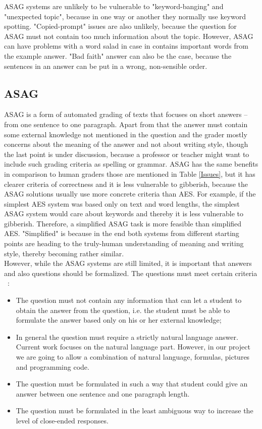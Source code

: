 ASAG systems are unlikely to be vulnerable to "keyword-banging" and "unexpected topic", because in one way or another they normally use keyword spotting. "Copied-prompt" issues are also unlikely, because the question for ASAG must not contain too much information about the topic. However, ASAG can have problems with a word salad in case in contains important words from the example answer. "Bad faith" answer can also be the case, because the sentences in an answer can be put in a wrong, non-sensible order.


\subsection{ASAG}

ASAG is a form of automated grading of texts that focuses on short answers -- from one sentence to one paragraph. Apart from that the answer must contain some external knowledge not mentioned in the question and the grader mostly concerns about the meaning of the answer and not about writing style, though the last point is under discussion, because a professor or teacher might want to include such grading criteria as spelling or grammar. ASAG has the same benefits in comparison to human graders those are mentioned in Table \ref{Issues}, but it has clearer criteria of correctness and it is less vulnerable to gibberish, because the ASAG solutions usually use more concrete criteria than AES. For example, if the simplest AES system was based only on text and word lengths, the simplest ASAG system would care about keywords and thereby it is less vulnerable to gibberish. Therefore, a simplified ASAG task is more feasible than simplified AES. "Simplified" is because in the end both systems from different starting points are heading  to the truly-human understanding of meaning and writing style, thereby becoming rather similar.\\

However, while the ASAG systems are still limited, it is important that answers and also questions should be formalized. The questions must meet certain criteria ~\cite{Hasanah}:
\begin{itemize}
\item The question must not contain any information that can let a student to obtain the answer from the question, i.e. the student must be able to formulate the answer based only on his or her external knowledge;
\item In general the question must require a strictly natural language answer. Current work focuses on the natural language part. However, in our project we are going to allow a combination of natural language, formulas, pictures and programming code.
\item The question must be formulated in such a way that student could give an answer between one sentence and one paragraph length.
\item The question must be formulated in the least ambiguous way to increase the level of close-ended responses.
\end{itemize}

